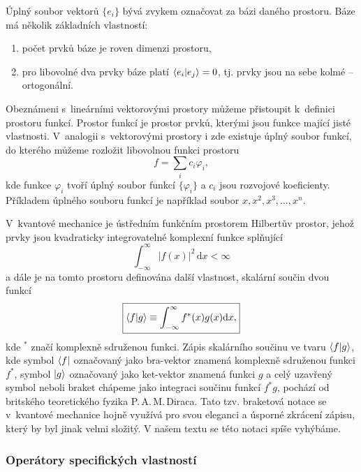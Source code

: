 Úplný soubor vektorů $\{e_i\}$ bývá zvykem označovat za bázi daného prostoru. Báze má několik základních vlastností:
\begin{enumerate}
\item počet prvků báze je roven dimenzi prostoru,
\item pro libovolné dva prvky báze platí $\braket{e_i|e_j} = 0$, tj. prvky jsou na sebe kolmé -- ortogonální.
\end{enumerate}

Obeznámeni s~lineárními vektorovými prostory můžeme přistoupit k~definici prostoru funkcí. Prostor funkcí je prostor prvků, kterými jsou funkce mající jisté vlastnosti. V~analogii s~vektorovými prostory i zde existuje úplný soubor funkcí, do kterého můžeme rozložit libovolnou funkci prostoru
\begin{equation}
f = \sum_i c_i \varphi_i,
\label{rov:RozvojDoBazeFunkci}
\end{equation}
kde funkce $\varphi_i$ tvoří úplný soubor funkcí $\{\varphi_i\}$ a $c_i$ jsou rozvojové koeficienty. Příkladem úplného souboru funkcí je například soubor $x, x^2, x^3, \dots, x^n$.

V~kvantové mechanice je ústředním funkčním prostorem Hilbertův prostor, jehož prvky jsou kvadraticky integrovatelné komplexní funkce  splňující
\begin{equation}
\boxed{\int_{-\infty}^{\infty} |f(x)|^2 \,\mathrm{d}x < \infty}
\label{rov:KvandarickaIntegrovatelnost}
\end{equation} 
a dále je na tomto prostoru definována další vlastnost, skalární součin dvou funkcí
\begin{equation}
\boxed{\braket{f|g} \equiv \int_{-\infty}^{\infty} f^{\ast}(x) g(x) \mathrm{d}x,}
\label{rov:SkalarniSoucinFci}
\end{equation}
kde $^{\ast}$ značí komplexně sdruženou funkci. Zápis skalárního součinu ve tvaru $\braket{f|g}$, kde symbol $\bra{f}$ označovaný jako bra-vektor znamená komplexně sdruženou funkci $f^{\ast}$, symbol $\ket{g}$ označovaný jako ket-vektor znamená funkci $g$ a celý uzavřený symbol neboli braket chápeme jako integraci součinu funkcí $f^{\ast}g$, pochází od britského teoretického fyzika P.\,A.\,M.\,Diraca. Tato tzv. braketová notace se v~kvantové mechanice hojně využívá pro svou eleganci a úsporné zkrácení zápisu, který by byl jinak velmi složitý. V našem textu se této notaci spíše vyhýbáme.



\subsubsection{Operátory specifických vlastností}
\label{kap:OperatorySpecifickychVlastnosti}

